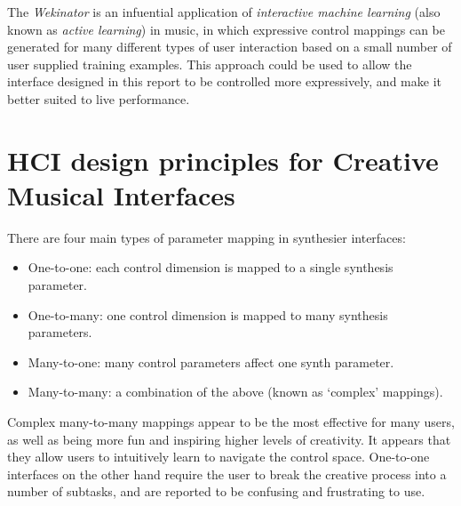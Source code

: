 \documentclass[11pt, oneside]{report}   	%
\begin{document}
The \emph{Wekinator} \cite{Wekinator} is an infuential application of \emph{interactive machine learning} (also known as \emph{active learning}) in music, in which expressive control mappings can be generated for many different types of user interaction based on a small number of user supplied training examples. This approach could be used to allow the interface designed in this report to be controlled more expressively, and make it better suited to live performance.
\section{HCI design principles for Creative Musical Interfaces}\label{sec:Tubb}
There are four main types of parameter mapping in synthesier interfaces:\cite{MappingStrategies}
\begin{itemize}
\vspace{-10pt}
\setlength\itemsep{-1.2em}
\item One-to-one: each control dimension is mapped to a single synthesis parameter.
\item One-to-many: one control dimension is mapped to many synthesis parameters.
\item Many-to-one: many control parameters affect one synth parameter.
\item Many-to-many: a combination of the above (known as ‘complex’ mappings).
\end{itemize}
\vspace{-10pt}
Complex many-to-many mappings appear to be the most effective for many users, as well as being more fun and inspiring higher levels of creativity. It appears that they allow users to intuitively learn to navigate the control space. One-to-one interfaces on the other hand require the user to break the creative process into a number of subtasks, and are reported to be confusing and frustrating to use.
\end{document}
